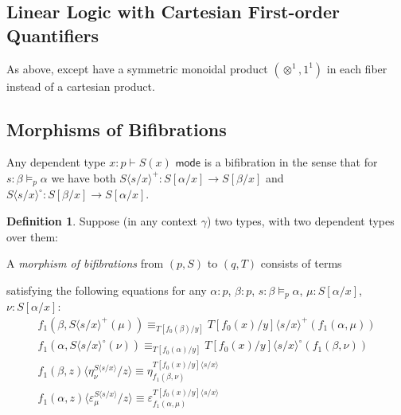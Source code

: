 \documentclass[10pt]{article}
\theoremstyle{definition}
\newtheorem{definition}{Definition}
\newcommand{\Yields}{\vDash}
\newcommand{\type}{\,\,\mathsf{mode}}
\newcommand\TrPlus[2]{\ensuremath{#1^+(#2)}}
\newcommand\TrCirc[2]{\ensuremath{#1^\circ(#2)}}
\newcommand\ap[2]{\ensuremath{#1 \langle #2 \rangle }}
\begin{document}
\subsection{Linear Logic with Cartesian First-order Quantifiers}

As above, except have a symmetric monoidal product $(\otimes^1,1^1)$ in
each fiber instead of a cartesian product.  

\subsection{Morphisms of Bifibrations}

Any dependent type $x : p \vdash S(x) \type$ is a bifibration in the
sense that for $s : \beta \Yields_p \alpha$ we have both $\ap{S}{s/x}^+
: S[\alpha/x] \to S[\beta/x]$ and $\ap{S}{s/x}^\circ : S[\beta/x] \to
S[\alpha/x]$.

\begin{definition}
Suppose (in any context $\gamma$) two types, with two dependent types
over them:
A \emph{morphism of bifibrations} from $(p,S)$ to $(q,T)$ consists of terms
satisfying the following equations for any $\alpha : p$, $\beta : p$, $s
: \beta \Yields_p \alpha$, $\mu : S[\alpha/x]$, $\nu : S[\alpha/x]$:
\begin{align}
\label{mor-fib-subst}
f_1(\beta,\TrPlus{\ap{S}{s/x}}{\mu}) \equiv_{T[f_0(\beta)/y]} \TrPlus{\ap{T[f_0(x)/y]}{s/x}}{f_1(\alpha,\mu)}\\
\label{mor-opfib-subst}
f_1(\alpha,\TrCirc{\ap{S}{s/x}}{\nu}) \equiv_{T[f_0(\alpha)/y]} \TrCirc{\ap{T[f_0(x)/y]}{s/x}}{f_1(\beta,\nu)}\\
\label{mor-fib-unit}
\ap{f_1(\beta,z)}{\eta^{\ap{S}{s/x}}_\nu/z} \equiv \eta^{{\ap{T[f_0(x)/y]}{s/x}}}_{f_1(\beta,\nu)}\\
\label{mor-fib-counit}
\ap{f_1(\alpha,z)}{\varepsilon^{\ap{S}{s/x}}_\mu/z} \equiv
\varepsilon^{{\ap{T[f_0(x)/y]}{s/x}}}_{f_1(\alpha,\mu)}
\end{align}
\end{definition}
\end{document}
